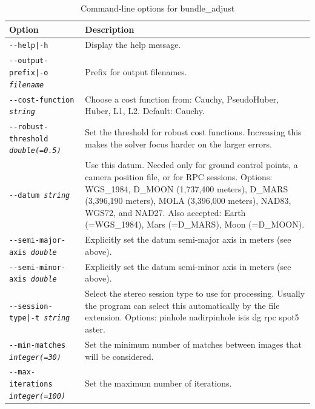 \begin{longtable}{|p{8cm}|p{9cm}|}
\caption{Command-line options for bundle\_adjust}
\label{tbl:bundleadjust}
\endfirsthead
\endhead
\endfoot
\endlastfoot
\hline
Option & Description \\ \hline \hline
\texttt{-\/-help|-h} & Display the help message. \\ \hline

\texttt{-\/-output-prefix|-o \textit{filename}} & Prefix for output filenames. \\ \hline

\texttt{-\/-cost-function \textit{string}} & Choose a cost function
from: Cauchy, PseudoHuber, Huber, L1, L2. Default: Cauchy. \\ \hline

\texttt{-\/-robust-threshold \textit{double(=0.5)}} & Set the threshold for robust
cost functions.  Increasing this makes the solver focus harder on the larger errors.\\ \hline

\texttt{-\/-datum \textit{string}} & 
Use this datum. Needed only for ground control points, a camera position file, or for RPC sessions. Options: WGS\_1984, D\_MOON (1,737,400 meters), D\_MARS (3,396,190 meters), MOLA (3,396,000 meters), NAD83, WGS72, and NAD27. Also accepted: Earth (=WGS\_1984), Mars (=D\_MARS), Moon (=D\_MOON). \\ \hline

\texttt{-\/-semi-major-axis \textit{double}} & Explicitly set the datum semi-major axis
in meters (see above).\\ \hline
\texttt{-\/-semi-minor-axis \textit{double}} & Explicitly set the datum semi-minor axis
in meters (see above).\\ \hline

\texttt{-\/-session-type|-t \textit{string}} & Select the stereo
session type to use for processing. Usually the program can select this
automatically by the file extension. Options: pinhole nadirpinhole isis dg rpc spot5 aster. \\ \hline

\texttt{-\/-min-matches \textit{integer(=30)}} & Set the minimum number of matches
between images that will be considered. \\ \hline

\texttt{-\/-max-iterations \textit{integer(=100)}} & Set the maximum
number of iterations. \\ \hline


\end{longtable}
